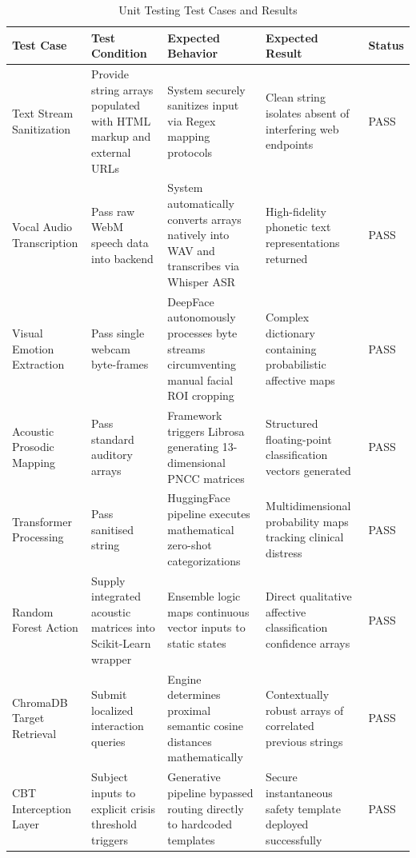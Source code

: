 \documentclass[11pt]{report}
\begin{document}
\begin{table}[H]
    \centering
    \caption{Unit Testing Test Cases and Results}
    \label{tab:unit_testing}
    \begin{tabular}{|p{3cm}|p{3.5cm}|p{3.5cm}|p{3cm}|p{1.3cm}|}
        \hline
        Test Case & Test Condition & Expected Behavior & Expected Result & Status \\ \hline
        Text Stream Sanitization & Provide string arrays populated with HTML markup and external URLs & System securely sanitizes input via Regex mapping protocols & Clean string isolates absent of interfering web endpoints & PASS \\ \hline
        Vocal Audio Transcription & Pass raw WebM speech data into backend & System automatically converts arrays natively into WAV and transcribes via Whisper ASR & High-fidelity phonetic text representations returned & PASS \\ \hline
        Visual Emotion Extraction & Pass single webcam byte-frames & DeepFace autonomously processes byte streams circumventing manual facial ROI cropping & Complex dictionary containing probabilistic affective maps & PASS \\ \hline
        Acoustic Prosodic Mapping & Pass standard auditory arrays & Framework triggers Librosa generating 13-dimensional PNCC matrices & Structured floating-point classification vectors generated & PASS \\ \hline
        Transformer Processing & Pass sanitised string & HuggingFace pipeline executes mathematical zero-shot categorizations & Multidimensional probability maps tracking clinical distress & PASS \\ \hline
        Random Forest Action & Supply integrated acoustic matrices into Scikit-Learn wrapper & Ensemble logic maps continuous vector inputs to static states & Direct qualitative affective classification confidence arrays & PASS \\ \hline
        ChromaDB Target Retrieval & Submit localized interaction queries & Engine determines proximal semantic cosine distances mathematically & Contextually robust arrays of correlated previous strings & PASS \\ \hline
        CBT Interception Layer & Subject inputs to explicit crisis threshold triggers & Generative pipeline bypassed routing directly to hardcoded templates & Secure instantaneous safety template deployed successfully & PASS \\ \hline
    \end{tabular}
\end{table}
\end{document}

